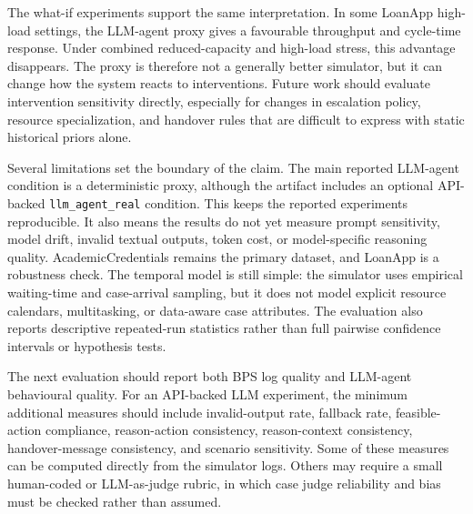 The what-if experiments support the same interpretation. In some
LoanApp high-load settings, the LLM-agent proxy gives a favourable
throughput and cycle-time response. Under combined reduced-capacity and
high-load stress, this advantage disappears. The proxy is therefore not
a generally better simulator, but it can change how the system reacts to
interventions. Future work should evaluate intervention sensitivity
directly, especially for changes in escalation policy, resource
specialization, and handover rules that are difficult to express with
static historical priors alone.

Several limitations set the boundary of the claim. The main reported
LLM-agent condition is a deterministic proxy, although the artifact
includes an optional API-backed \texttt{llm\_agent\_real} condition.
This keeps the reported experiments reproducible. It also means the
results do not yet measure prompt sensitivity, model drift, invalid
textual outputs, token cost, or model-specific reasoning quality.
AcademicCredentials remains the primary dataset, and LoanApp is a
robustness check. The temporal model is still simple: the simulator uses
empirical waiting-time and case-arrival sampling, but it does not model
explicit resource calendars, multitasking, or data-aware case
attributes. The evaluation also reports descriptive repeated-run
statistics rather than full pairwise confidence intervals or hypothesis
tests.

The next evaluation should report both BPS log quality and LLM-agent
behavioural quality. For an API-backed LLM experiment, the
minimum additional measures should include invalid-output rate, fallback
rate, feasible-action compliance, reason-action consistency,
reason-context consistency, handover-message consistency, and scenario
sensitivity. Some of these measures can be computed directly from the
simulator logs. Others may require a small human-coded or LLM-as-judge
rubric, in which case judge reliability and bias must be checked rather
than assumed.
